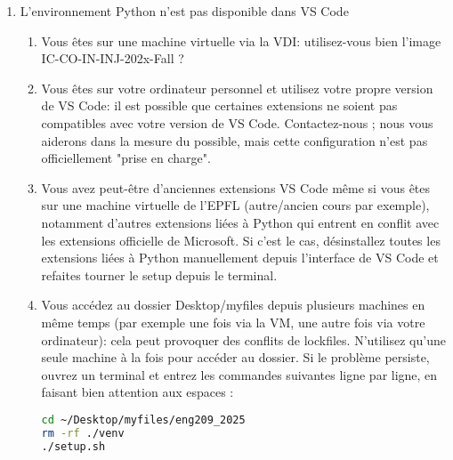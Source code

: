 \documentclass[10pt]{article}
\begin{document}
\begin{enumerate}
\item L’environnement Python n’est pas disponible dans VS Code
\begin{enumerate} 
\item Vous êtes sur une machine virtuelle via la VDI: utilisez-vous bien l’image IC-CO-IN-INJ-202x-Fall ?
\item Vous êtes sur votre ordinateur personnel et utilisez votre propre version de VS Code: il est possible que certaines extensions ne soient pas compatibles avec votre version de VS Code. Contactez-nous ; nous vous aiderons dans la mesure du possible, mais cette configuration n’est pas officiellement "prise en charge".
\item Vous avez peut-être d'anciennes extensions VS Code même si vous êtes sur une machine virtuelle de l'EPFL (autre/ancien cours par exemple), notamment d'autres extensions liées à Python qui entrent en conflit avec les extensions officielle de Microsoft. Si c'est le cas, désinstallez toutes les extensions liées à Python manuellement depuis l'interface de VS Code et refaites tourner le setup depuis le terminal.
\item Vous accédez au dossier Desktop/myfiles depuis plusieurs machines en même temps (par exemple une fois via la VM, une autre fois via votre ordinateur): cela peut provoquer des conflits de lockfiles. N’utilisez qu’une seule machine à la fois pour accéder au dossier.
Si le problème persiste, ouvrez un terminal et entrez les commandes suivantes ligne par ligne, en faisant bien attention aux espaces :
\begin{lstlisting}[language=Bash]
cd ~/Desktop/myfiles/eng209_2025
rm -rf ./venv
./setup.sh
\end{lstlisting}
\end{enumerate}
\end{enumerate}
\end{document}
